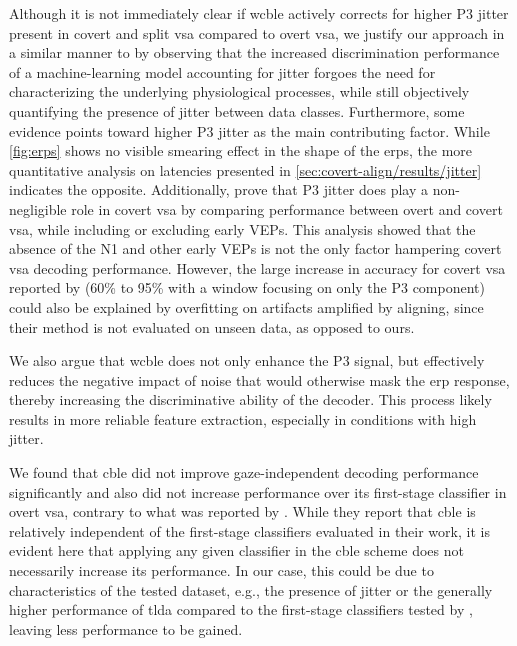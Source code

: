 Although it is not immediately clear if \ac{wcble} actively corrects for higher P3 jitter
present in covert and split \ac{vsa} compared to overt \ac{vsa},
we justify our approach in a similar manner to \textcite{Hardiansyah2020} by
observing that the increased discrimination performance of a machine-learning
model accounting for jitter forgoes the need for characterizing the underlying
physiological processes, while still objectively quantifying the presence of
jitter between data classes.
Furthermore, some evidence points toward higher P3 jitter as the main
contributing factor.
While \autoref{fig:erps} shows no visible smearing effect in
the shape of the \acp{erp}, the more quantitative analysis on latencies
presented in \cref{sec:covert-align/results/jitter}
indicates the opposite.
Additionally, \textcite{Arico2014} prove that P3 jitter does play a
non-negligible role in covert \ac{vsa} by comparing performance between
overt and covert \ac{vsa}, while including or excluding early VEPs.
This analysis showed that the absence of the N1 and other early VEPs is not the
only factor hampering covert \ac{vsa} decoding performance.
However, the large increase in accuracy for covert \ac{vsa} reported by
\textcite{Arico2014} (60\% to 95\% with a window focusing on only the P3
component) could also be explained by overfitting on artifacts amplified by
aligning, since their method is not evaluated on unseen data, as opposed to ours.

We also argue that \ac{wcble} does not only enhance the P3 signal, but effectively reduces the
negative impact of noise that would otherwise mask the \ac{erp} response, thereby increasing the
discriminative ability of the decoder.
This process likely results in more reliable feature extraction, especially in conditions
with high jitter.

We found that \ac{cble} did not improve gaze-independent decoding performance
significantly and also did not increase performance over its first-stage
classifier in overt \ac{vsa}, contrary to what was reported by \textcite{Mowla2017}.
While they report that \ac{cble} is relatively independent of the
first-stage classifiers evaluated in their work, it is evident here that
applying any given classifier in the \ac{cble} scheme does not necessarily increase
its performance.
In our case, this could be due to characteristics of the tested dataset, e.g.,
the presence of jitter or the generally higher performance of \ac{tlda} compared to the
first-stage classifiers tested by \textcite{Mowla2017}, leaving less
performance to be gained.

